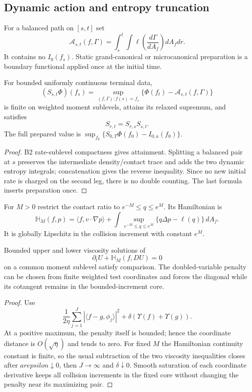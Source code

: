 \subsection{Dynamic action and entropy truncation}

For a balanced path on $[s,t]$ set
\[
 \mathcal A_{s,t}(f,\Gamma)
 =\int_s^t\!\int
 \ell\left(\frac{d\Gamma}{dA_f}
 \right)dA_fdr.
\]
It contains no $I_0(f_s)$.  Static grand-canonical or microcanonical
preparation is a boundary functional applied once at the initial time.

\begin{theorem}
\label{thm:r9-b4-action}
For bounded uniformly continuous terminal data,
\[
 (S_{s,t}\Phi)(f_s)
 =\sup_{(f,\Gamma):f(s)=f_s}
 \{\Phi(f_t)-\mathcal A_{s,t}(f,\Gamma)\}
\]
is finite on weighted moment sublevels, attains its relaxed supremum, and
satisfies
\[
 S_{r,t}=S_{r,s}S_{s,t}.
\]
The full prepared value is
$\sup_{f_0}\{S_{0,T}\Phi(f_0)-I_{0,a}(f_0)\}$.
\end{theorem}

\begin{proof}
B2 rate-sublevel compactness gives attainment.  Splitting a balanced pair at
$s$ preserves the intermediate density/contact trace and adds the two dynamic
entropy integrals; concatenation gives the reverse inequality.  Since no new
initial rate is charged on the second leg, there is no double counting.  The
last formula inserts preparation once.
\end{proof}

For $M>0$ restrict the contact ratio to
$e^{-M}\le q\le e^M$.  Its Hamiltonian is
\[
 \mathbb H_M(f,p)
 =\langle f,v\cdot\nabla p\rangle
 +\int\sup_{e^{-M}\le q\le e^M}
 \{q\Delta p-\ell(q)\}\,dA_f.
\]
It is globally Lipschitz in the collision increment with constant $e^M$.

\begin{lemma}
\label{lem:r9-b4-comparisonM}
Bounded upper and lower viscosity solutions of
\[
 \partial_tU+\mathbb H_M(f,DU)=0
\]
on a common moment sublevel satisfy comparison.  The doubled-variable
penalty can be chosen from finite weighted test coordinates and forces the
diagonal while its cotangent remains in the bounded-increment core.
\end{lemma}

\begin{proof}
Use
\[
 \frac1{2\eta}\sum_{j=1}^{J}
 |\langle f-g,\phi_j\rangle|^2
 +\delta(\Upsilon(f)+\Upsilon(g)).
\]
At a positive maximum, the penalty itself is bounded; hence the coordinate
distance is $O(\sqrt\eta)$ and tends to zero.  For fixed $M$ the Hamiltonian
continuity constant is finite, so the usual subtraction of the two viscosity
inequalities closes after $arepsilon\downarrow0$, then $J\to\infty$ and
$\delta\downarrow0$.  Smooth saturation of each coordinate derivative keeps
all collision increments in the fixed core without changing the penalty near
its maximizing pair.
\end{proof}

